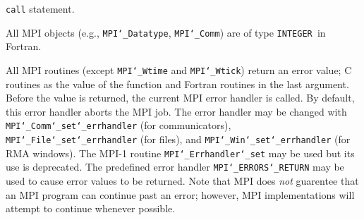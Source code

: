 {\tt call} statement.
\par
All MPI objects (e.g., {\tt MPI{\tt \char`\_}Datatype}, {\tt MPI{\tt \char`\_}Comm}) are of type {\tt INTEGER
}in Fortran.
\par
{}
\par
All MPI routines (except {\tt MPI{\tt \char`\_}Wtime} and {\tt MPI{\tt \char`\_}Wtick}) return an error value;
C routines as the value of the function and Fortran routines in the last
argument.  Before the value is returned, the current MPI error handler is
called.  By default, this error handler aborts the MPI job.  The error handler
may be changed with {\tt MPI{\tt \char`\_}Comm{\tt \char`\_}set{\tt \char`\_}errhandler} (for communicators),
{\tt MPI{\tt \char`\_}File{\tt \char`\_}set{\tt \char`\_}errhandler} (for files), and {\tt MPI{\tt \char`\_}Win{\tt \char`\_}set{\tt \char`\_}errhandler} (for
RMA windows).  The MPI-1 routine {\tt MPI{\tt \char`\_}Errhandler{\tt \char`\_}set} may be used but
its use is deprecated.  The predefined error handler
{\tt MPI{\tt \char`\_}ERRORS{\tt \char`\_}RETURN} may be used to cause error values to be returned.
Note that MPI does {\em not} guarentee that an MPI program can continue past
an error; however, MPI implementations will attempt to continue whenever
possible.
\par
{}
\endmanpage
